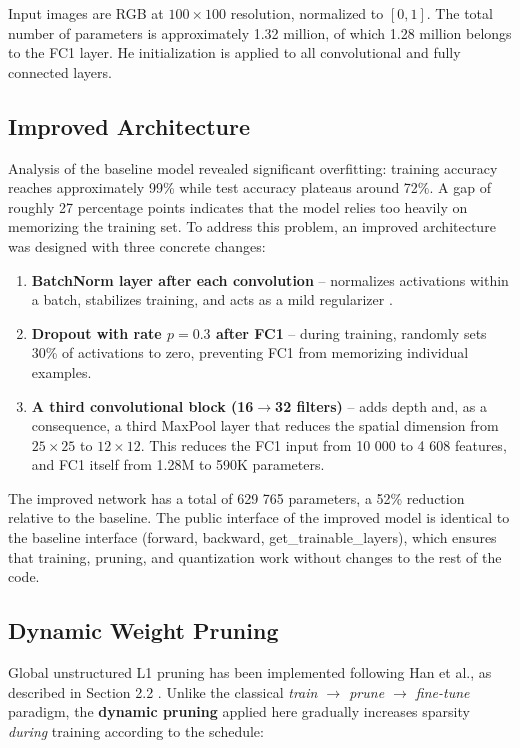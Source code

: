 \documentclass[letterpaper, 10 pt, conference]{ieeeconf}
\begin{document}
Input images are RGB at $100\times100$ resolution, normalized to $[0,1]$.
The total number of parameters is approximately 1.32 million, of which 1.28 million belongs to the FC1 layer.
He initialization is applied to all convolutional and fully connected layers.

\subsection{Improved Architecture}

Analysis of the baseline model revealed significant overfitting: training accuracy reaches approximately 99\% while test accuracy plateaus around 72\%.
A gap of roughly 27 percentage points indicates that the model relies too heavily on memorizing the training set.
To address this problem, an improved architecture was designed with three concrete changes:

\begin{enumerate}
  \item \textbf{BatchNorm layer after each convolution} -- normalizes activations within a batch, stabilizes training, and acts as a mild regularizer \cite{ioffe2015batchnorm}.
  \item \textbf{Dropout with rate $p=0.3$ after FC1} -- during training, randomly sets 30\% of activations to zero, preventing FC1 from memorizing individual examples.
  \item \textbf{A third convolutional block (16$\rightarrow$32 filters)} -- adds depth and, as a consequence, a third MaxPool layer that reduces the spatial dimension from $25\times25$ to $12\times12$. This reduces the FC1 input from 10 000 to 4 608 features, and FC1 itself from 1.28M to 590K parameters.
\end{enumerate}

The improved network has a total of 629 765 parameters, a 52\% reduction relative to the baseline.
The public interface of the improved model is identical to the baseline interface (forward, backward, get\_trainable\_layers), which ensures that training, pruning, and quantization work without changes to the rest of the code.

\subsection{Dynamic Weight Pruning}

Global unstructured L1 pruning has been implemented following Han et al., as described in Section 2.2 \cite{li2023survey}.
Unlike the classical \textit{train $\rightarrow$ prune $\rightarrow$ fine-tune} paradigm, the \textbf{dynamic pruning} applied here gradually increases sparsity \textit{during} training according to the schedule:
\end{document}
